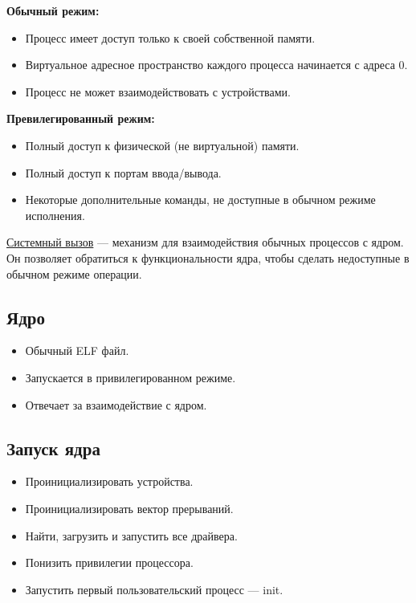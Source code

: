 \textbf{Обычный режим:}
\begin{itemize}
	\item Процесс имеет доступ только к своей собственной памяти.
	\item Виртуальное адресное пространство каждого процесса начинается с адреса 0.
	\item Процесс не может взаимодействовать с устройствами.
\end{itemize}

\textbf{Превилегированный режим:}
\begin{itemize}
	\item Полный доступ к физической (не виртуальной) памяти.
	\item Полный доступ к портам ввода/вывода.
	\item Некоторые дополнительные команды, не доступные в обычном режиме исполнения.
\end{itemize}

\begin{Def}
	\underline{Системный вызов} --- механизм для взаимодействия обычных процессов с ядром. 
	Он позволяет обратиться к функциональности ядра, чтобы сделать недоступные в обычном
	режиме операции.
\end{Def}

\subsection{Ядро}

\begin{itemize}
	\item Обычный ELF файл.
	\item Запускается в привилегированном режиме.
	\item Отвечает за взаимодействие с ядром.
\end{itemize}

\subsection{Запуск ядра}

\begin{itemize}
	\item Проинициализировать устройства.
	\item Проинициализировать вектор прерываний.
	\item Найти, загрузить и запустить все драйвера.
	\item Понизить привилегии процессора.
	\item Запустить первый пользовательский процесс --- init.
\end{itemize}

